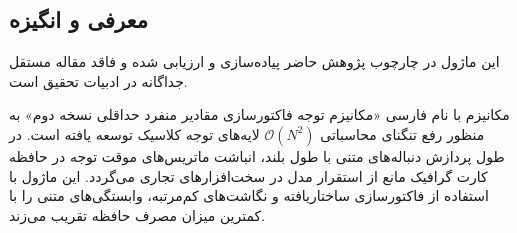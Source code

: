 \subsection{معرفی و انگیزه}
این ماژول در چارچوب پژوهش حاضر پیاده‌سازی و ارزیابی شده و فاقد مقاله مستقل جداگانه در ادبیات تحقیق است.

مکانیزم  با نام فارسی «مکانیزم توجه فاکتورسازی مقادیر منفرد حداقلی نسخه دوم» به منظور رفع تنگنای محاسباتی $\mathcal{O}(N^2)$ لایه‌های توجه کلاسیک توسعه یافته است. در طول پردازش دنباله‌های متنی با طول بلند، انباشت ماتریس‌های موقت توجه در حافظه کارت گرافیک مانع از استقرار مدل در سخت‌افزارهای تجاری می‌گردد. این ماژول با استفاده از فاکتورسازی ساختاریافته و نگاشت‌های کم‌مرتبه، وابستگی‌های متنی را با کمترین میزان مصرف حافظه تقریب می‌زند.
